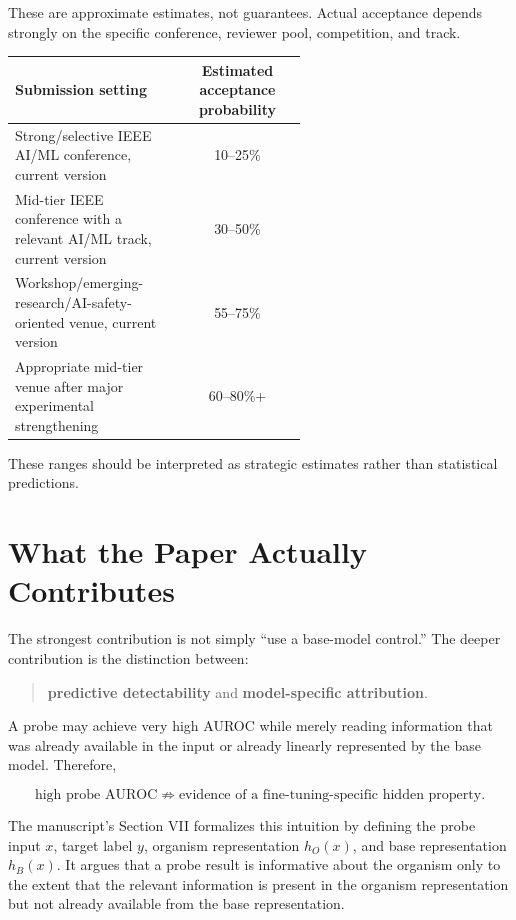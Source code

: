 \documentclass[11pt,a4paper]{article}
\begin{document}
These are approximate estimates, not guarantees. Actual acceptance depends strongly on the specific conference, reviewer pool, competition, and track.

\begin{center}
\begin{tabular}{p{0.58\linewidth}c}
\toprule
\textbf{Submission setting} & \textbf{Estimated acceptance probability}\\
\midrule
Strong/selective IEEE AI/ML conference, current version & 10--25\%\\
Mid-tier IEEE conference with a relevant AI/ML track, current version & 30--50\%\\
Workshop/emerging-research/AI-safety-oriented venue, current version & 55--75\%\\
Appropriate mid-tier venue after major experimental strengthening & 60--80\%+\\
\bottomrule
\end{tabular}
\end{center}

These ranges should be interpreted as strategic estimates rather than statistical predictions.

\section{What the Paper Actually Contributes}

The strongest contribution is not simply ``use a base-model control.'' The deeper contribution is the distinction between:

\begin{quote}
\textbf{predictive detectability} and \textbf{model-specific attribution}.
\end{quote}

A probe may achieve very high AUROC while merely reading information that was already available in the input or already linearly represented by the base model. Therefore,

\[
\text{high probe AUROC}
\not\Rightarrow
\text{evidence of a fine-tuning-specific hidden property}.
\]

The manuscript's Section VII formalizes this intuition by defining the probe input \(x\), target label \(y\), organism representation \(h_O(x)\), and base representation \(h_B(x)\). It argues that a probe result is informative about the organism only to the extent that the relevant information is present in the organism representation but not already available from the base representation.
\end{document}
